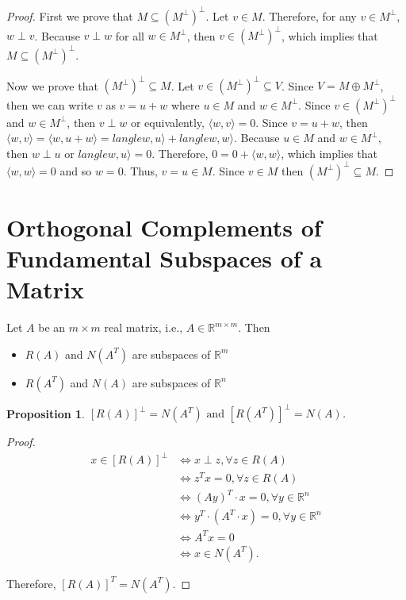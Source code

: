 \documentclass[12pt]{article}
\newtheorem*{proposition}{Proposition}
\theoremstyle{definition}
\begin{document}
\begin{proof}
First we prove that $M \subseteq (M^{\perp})^{\perp}$. Let $v \in M$. Therefore, for any
$v \in M^{\perp}$, $w \perp v$. Because $v \perp w$ for all $w \in M^{\perp}$, then
$v \in (M^{\perp})^{\perp}$, which implies that $M \subseteq (M^{\perp})^{\perp}$.

Now we prove that $(M^{\perp})^{\perp} \subseteq M$. Let $v \in (M^{\perp})^{\perp}
\subseteq V$. Since $V = M \oplus M^{\perp}$, then we can write $v$ as
$v = u + w$ where $u \in M$ and $w \in M^{\perp}$. Since $v \in (M^{\perp})^{\perp}$
and $w \in M^{\perp}$, then $v \perp w$ or equivalently, $\langle w, v \rangle = 0$.
Since $v = u + w$, then $\langle w, v \rangle = \langle w, u + w \rangle = langle w, u 
\rangle + langle w , w \rangle$. Because $u \in M$ and $w \in M^{\perp}$, then 
$w \perp u$ or $langle w, u \rangle = 0$. Therefore, $0 = 0 + \langle w, w \rangle$,
which implies that $\langle w, w \rangle = 0$ and so $w = 0$. Thus, $v = u \in M$.
Since $v \in M$ then $(M^{\perp})^{\perp} \subseteq M$.
\end{proof}

\section{Orthogonal Complements of Fundamental Subspaces of a Matrix}

Let $A$ be an $m \times m$ real matrix, i.e., $A \in \mathbb{R}^{m \times m}$. Then

\begin{itemize}
\item $R(A)$ and $N(A^T)$ are subspaces of $\mathbb{R}^m$
\item $R(A^T)$ and $N(A)$ are subspaces of $\mathbb{R}^n$
\end{itemize}

\begin{proposition}
$[R(A)]^{\perp} = N(A^T) \text{ and } [R(A^T)]^{\perp} = N(A)$.
\end{proposition}

\begin{proof}
\begin{align*}
x \in [R(A)]^{\perp} &\iff x \perp z, \forall z \in R(A) \\
&\iff z^T x = 0, \forall z \in R(A) \\
&\iff (Ay)^T \cdot x = 0, \forall y \in \mathbb{R}^n \\
&\iff y^T \cdot (A^T \cdot x) = 0, \forall y \in \mathbb{R}^n \\
&\iff A^T x = 0 \\
&\iff x \in N(A^T).
\end{align*}

Therefore, $[R(A)]^T = N(A^T)$.
\end{proof}
\end{document}

